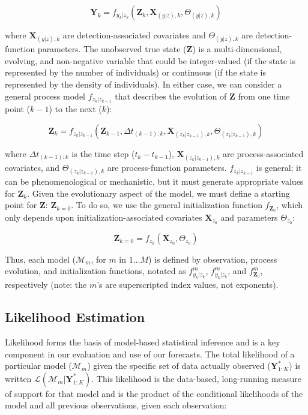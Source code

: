 \documentclass{article}
\begin{document}
\begin{equation}
\textbf{Y}_k = f_{y_k|z_k}(\textbf{Z}_k, \textbf{X}_{(y|z), k}, \Theta_{(y|z), k})
\end{equation}

where $\textbf{X}_{(y|z), k}$ are detection-associated covariates and $\Theta_{(y|z), k}$ are detection-function parameters. The unobserved true state ($\textbf{Z}$) is a multi-dimensional, evolving, and non-negative variable that could be integer-valued (if the state is represented by the number of individuals) or continuous (if the state is represented by the density of individuals). In either case, we can consider a general process model $f_{z_k|z_{k-1}}$ that describes the evolution of $\textbf{Z}$ from one time point ($k-1$) to the next ($k$):

\begin{equation}
\textbf{Z}_{k} = f_{z_k|z_{k-1}}(\textbf{Z}_{k-1}, \Delta t_{(k-1):k}, \textbf{X}_{(z_k|z_{k-1}), k},\Theta_{(z_k|z_{k-1}), k})
\end{equation}

where $\Delta t_{(k-1):k}$ is the time step ($t_k - t_{k-1}$), $\textbf{X}_{(z_k|z_{k-1}), k}$ are process-associated covariates, and $\Theta_{(z_k|z_{k-1}), k}$ are process-function parameters. $f_{z_k|z_{k-1}}$ is general; it can be phenomenological or mechanistic, but it must generate appropriate values for $\textbf{Z}_{k}$. Given the evolutionary aspect of the model, we must define a starting point for $\textbf{Z}$: $\textbf{Z}_{k=0}$. To do so, we use the general initialization function $f_{\textbf{Z}_0}$, which only depends upon initialization-associated covariates $\textbf{X}_{z_0}$ and parameters $\Theta_{z_0}$:

\begin{equation}
\textbf{Z}_{k=0} = f_{z_0}(\textbf{X}_{z_0}, \Theta_{z_0})
\end{equation}

Thus, each model ($\mathcal{M}_m$, for $m$ in $1 \ldots M$) is defined by observation, process evolution, and initialization functions, notated as $f^m_{y_k|z_k}$, $f^m_{y_k|z_k}$, and $f^m_{\textbf{Z}_0}$, respectively (note: the $m$'s are superscripted index values, not exponents). 

\subsection{Likelihood Estimation}
\label{subsec:devmods_le}

Likelihood forms the basis of model-based statistical inference \citep{Pawitan2001} and is a key component in our evaluation and use of our forecasts. The total likelihood of a particular model ($\mathcal{M}_m$) given the specific set of data actually observed ($\textbf{Y}^{*}_{1:K}$) is written $\mathcal{L}(\mathcal{M}_m|\textbf{Y}^{*}_{1:K})$. This likelihood is the data-based, long-running measure of support for that model and is the product of the conditional likelihoods of the model and all previous observations, given each observation:
\end{document}
